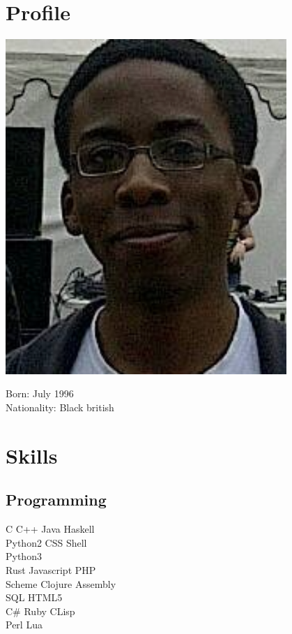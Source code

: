 \documentclass[11pt, a4paper]{cv}
\begin{document}
\begin{minipage}[t]{0.33\textwidth} %

\section{Profile}

\includegraphics[width=0.8\textwidth]{profile.png}

Born: July 1996 \\
Nationality: Black british

\section{Skills}

\subsection{Programming}

C \textbullet{} C++ \textbullet{} Java \textbullet{} Haskell \\
Python2 \textbullet{} CSS \textbullet{} Shell \\
Python3 \textbullet{} \LaTeXe\  \\\vspace{4pt}
Rust \textbullet{} Javascript \textbullet{} PHP \\
Scheme \textbullet{} Clojure \textbullet{} Assembly \\
SQL \textbullet{} {\small HTML5} \\\vspace{4pt}
C\# \textbullet{} Ruby \textbullet{} CLisp \\
Perl \textbullet{} Lua


\end{minipage}
\end{document}
